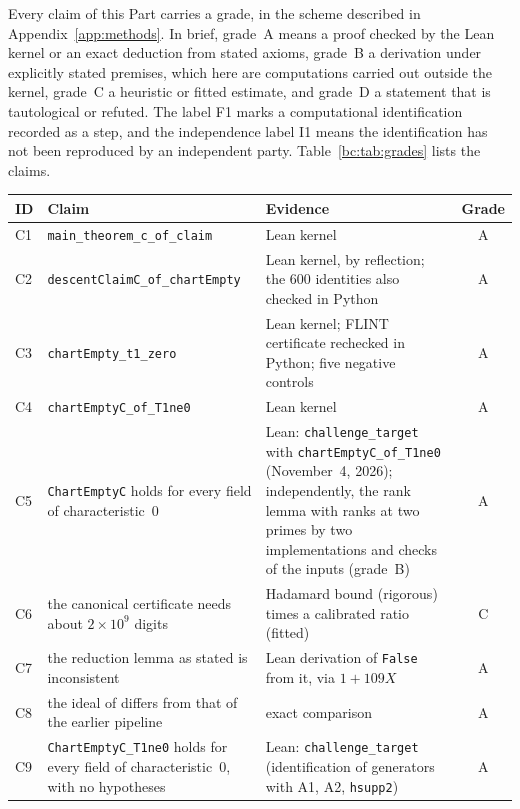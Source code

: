 \documentclass[a4paper,11pt]{article}
\newcommand{\filename}[1]{\texttt{\seqsplit{#1}}}
\let\jsOldToprule\toprule
\renewcommand{\toprule}{\jsOldToprule\rowcolor{bgheader}}
\theoremstyle{jsplain}
\theoremstyle{jsdef}
\theoremstyle{jsrem}
\begin{document}
Every claim of this Part carries a grade, in the scheme described in Appendix~\ref{app:methods}. In brief, grade~A means a proof checked by the Lean kernel or an exact deduction from stated axioms, grade~B a derivation under explicitly stated premises, which here are computations carried out outside the kernel, grade~C a heuristic or fitted estimate, and grade~D a statement that is tautological or refuted. The label F1 marks a computational identification recorded as a step, and the independence label I1 means the identification has not been reproduced by an independent party. Table~\ref{bc:tab:grades} lists the claims.

\begin{table}[htbp]
\centering
\small
\begin{tabular}{@{}l>{\raggedright\arraybackslash}p{}>{\raggedright\arraybackslash}p{}c@{}}
\toprule
ID & Claim & Evidence & Grade \\
\midrule
C1 & \texttt{main\_\allowbreak{}theorem\_\allowbreak{}c\_\allowbreak{}of\_\allowbreak{}claim} & Lean kernel & A \\
C2 & \texttt{descentClaimC\_\allowbreak{}of\_\allowbreak{}\allowbreak chartEmpty} & Lean kernel, by reflection; the $600$ identities also checked in Python & A \\
C3 & \texttt{chartEmpty\_\allowbreak{}t1\_\allowbreak{}zero} & Lean kernel; FLINT certificate rechecked in Python; five negative controls & A \\
C4 & \texttt{chartEmptyC\_\allowbreak{}of\_\allowbreak{}\allowbreak T1ne0} & Lean kernel & A \\
C5 & \texttt{ChartEmptyC} holds for every field of characteristic~$0$ & Lean: \texttt{challenge\_\allowbreak{}target} with \texttt{chartEmptyC\_\allowbreak{}of\_\allowbreak{}\allowbreak T1ne0} (November~4, 2026); independently, the rank lemma with ranks at two primes by two implementations and checks of the inputs (grade~B) & A \\
C6 & the canonical certificate needs about $2\times10^9$ digits & Hadamard bound (rigorous) times a calibrated ratio (fitted) & C \\
C7 & the reduction lemma as stated is inconsistent & Lean derivation of \texttt{False} from it, via $1+109X$ & A \\
C8 & the ideal of \filename{lower\_c.py} differs from that of the earlier pipeline & exact comparison & A \\
C9 & \texttt{ChartEmptyC\_\allowbreak{}T1ne0} holds for every field of characteristic~$0$, with no hypotheses & Lean: \texttt{challenge\_\allowbreak{}target} (identification of generators with A1, A2, \texttt{hsupp2}) & A \\

\end{tabular}
\end{table}
\end{document}

